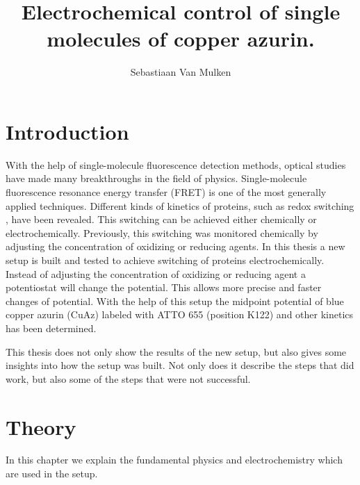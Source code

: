 \documentclass[twoside,single]{lion-msc}
\title{Electrochemical control of single molecules of copper azurin.}
\author{Sebastiaan Van Mulken}
\begin{document}
\maketitle



\chapter{Introduction}
With the help of single-molecule fluorescence detection methods, optical studies have made many breakthroughs in the field of physics. Single-molecule fluorescence resonance energy transfer (FRET) is one of the most generally applied techniques. Different kinds of kinetics of proteins, such as redox switching \cite{Akklc}, have been revealed. This switching can be achieved either chemically or electrochemically. Previously, this switching was monitored chemically by adjusting the concentration of oxidizing or reducing agents. In this thesis a new setup is built and tested to achieve switching of proteins electrochemically. Instead of adjusting the concentration of oxidizing or reducing agent a potentiostat will change the potential. This allows more precise and faster changes of potential. With the help of this setup the midpoint potential of blue copper azurin (CuAz) labeled with ATTO 655 (position K122) and other kinetics has been determined. 

This thesis does not only show the results of the new setup, but also gives some insights into how the setup was built. Not only does it describe the steps that did work, but also some of the steps that were not successful. 


\chapter{Theory}
In this chapter we explain the fundamental physics and electrochemistry which are used in the setup.
\end{document}
